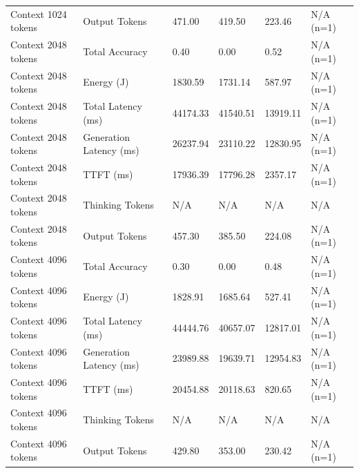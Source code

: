 \begin{table}
\begin{tabular}{llllll}
Context 1024 tokens & Output Tokens & 471.00 & 419.50 & 223.46 & N/A (n=1) \\
Context 2048 tokens & Total Accuracy & 0.40 & 0.00 & 0.52 & N/A (n=1) \\
Context 2048 tokens & Energy (J) & 1830.59 & 1731.14 & 587.97 & N/A (n=1) \\
Context 2048 tokens & Total Latency (ms) & 44174.33 & 41540.51 & 13919.11 & N/A (n=1) \\
Context 2048 tokens & Generation Latency (ms) & 26237.94 & 23110.22 & 12830.95 & N/A (n=1) \\
Context 2048 tokens & TTFT (ms) & 17936.39 & 17796.28 & 2357.17 & N/A (n=1) \\
Context 2048 tokens & Thinking Tokens & N/A & N/A & N/A & N/A \\
Context 2048 tokens & Output Tokens & 457.30 & 385.50 & 224.08 & N/A (n=1) \\
Context 4096 tokens & Total Accuracy & 0.30 & 0.00 & 0.48 & N/A (n=1) \\
Context 4096 tokens & Energy (J) & 1828.91 & 1685.64 & 527.41 & N/A (n=1) \\
Context 4096 tokens & Total Latency (ms) & 44444.76 & 40657.07 & 12817.01 & N/A (n=1) \\
Context 4096 tokens & Generation Latency (ms) & 23989.88 & 19639.71 & 12954.83 & N/A (n=1) \\
Context 4096 tokens & TTFT (ms) & 20454.88 & 20118.63 & 820.65 & N/A (n=1) \\
Context 4096 tokens & Thinking Tokens & N/A & N/A & N/A & N/A \\
Context 4096 tokens & Output Tokens & 429.80 & 353.00 & 230.42 & N/A (n=1) \\
\bottomrule
\end{tabular}
\end{table}
